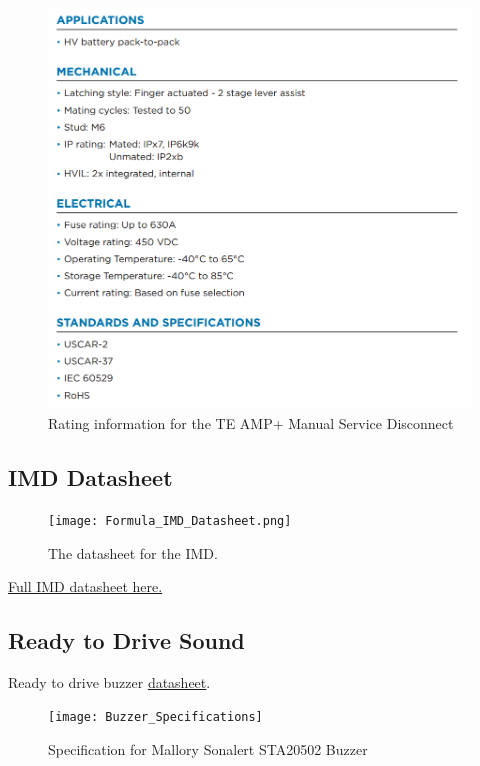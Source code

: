 \documentclass{article}
\begin{document}
\begin{figure}[H]
	\includegraphics[width=0.7\linewidth]{MSD_Ratings.png}
	\caption{Rating information for the TE AMP+ Manual Service Disconnect}
\end{figure}

\subsection{IMD Datasheet}\label{IMD_datasheet}

\begin{figure} [!ht]
	\centering  %
	
	\texttt{[image: Formula\_IMD\_Datasheet.png]}
	
	\caption{The datasheet for the IMD.}
	
	\label{fig:IMD_Datasheet}
\end{figure}

\href{http://www.bender-us.com/documents/IR155-10_datasheet_NAE1012821.pdf}{Full IMD datasheet here.}

\setcounter{subsection}{11}
\subsection{Ready to Drive Sound}\label{Ready to Drive}
Ready to drive buzzer \href{http://www.mallory-sonalert.com/specifications/STA20502.PDF}{datasheet}. \newline
\begin{figure}[H]
	\texttt{[image: Buzzer\_Specifications]}
	\caption{Specification for Mallory Sonalert STA20502 Buzzer}
\end{figure}
\end{document}
